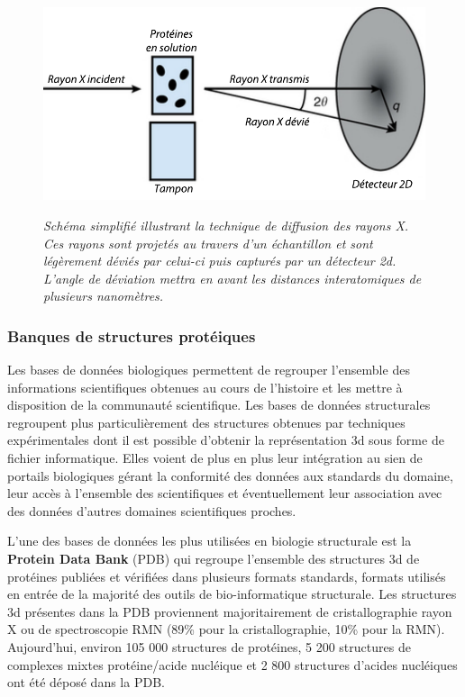 \begin{figure}
  \centering
  {\includegraphics[width=0.75\linewidth]{./figures/ch1/saxs.pdf}}
    \caption{\it Schéma simplifié illustrant la technique de diffusion des rayons X. Ces rayons sont projetés au travers d'un échantillon et sont légèrement déviés par celui-ci puis capturés par un détecteur 2d. L'angle de déviation mettra en avant les distances interatomiques de plusieurs nanomètres.}
    \label{Fig:saxs}
  \hspace{0.2cm}
\end{figure}


\subsubsection{Banques de structures protéiques} \label{protein_DB}

Les bases de données biologiques permettent de regrouper l'ensemble des informations scientifiques obtenues au cours de l'histoire et les mettre à disposition de la communauté scientifique. Les bases de données structurales regroupent plus particulièrement des structures obtenues par techniques expérimentales dont il est possible d'obtenir la représentation 3d sous forme de fichier informatique. 
Elles voient de plus en plus leur intégration au sien de portails biologiques gérant la conformité des données aux standards du domaine, leur accès à l'ensemble des scientifiques et éventuellement leur association avec des données d'autres domaines scientifiques proches.

L'une des bases de données les plus utilisées en biologie structurale est la \textbf{Protein Data Bank} (PDB) \cite{berman_protein_2000} qui regroupe l'ensemble des structures 3d de protéines publiées et vérifiées dans plusieurs formats standards, formats utilisés en entrée de la majorité des outils de bio-informatique structurale. Les structures 3d présentes dans la PDB proviennent majoritairement de cristallographie rayon X ou de spectroscopie RMN (89\% pour la cristallographie, 10\% pour la RMN). Aujourd'hui, environ 105 000 structures de protéines, 5 200 structures de complexes mixtes protéine/acide nucléique et 2 800 structures d'acides nucléiques ont été déposé dans la PDB.

